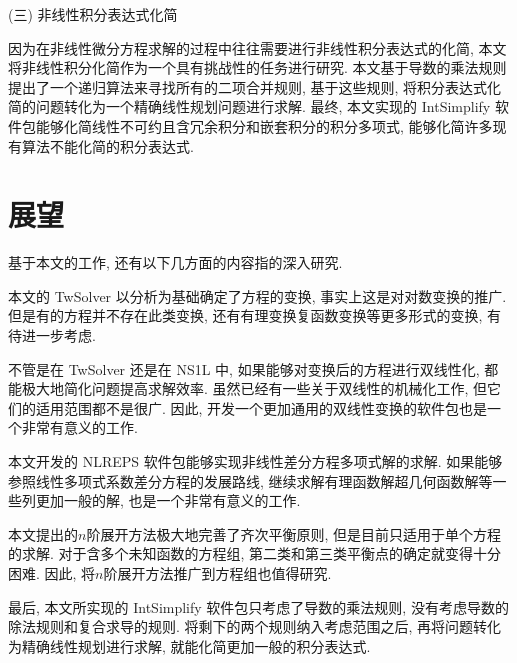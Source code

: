 (三) 非线性积分表达式化简

因为在非线性微分方程求解的过程中往往需要进行非线性积分表达式的化简, 本文将非线性积分化简作为一个具有挑战性的任务进行研究. 本文基于导数的乘法规则提出了一个递归算法来寻找所有的二项合并规则, 基于这些规则, 将积分表达式化简的问题转化为一个精确线性规划问题进行求解. 最终, 本文实现的 IntSimplify 软件包能够化简线性不可约且含冗余积分和嵌套积分的积分多项式, 能够化简许多现有算法不能化简的积分表达式.

\section{展望}
基于本文的工作, 还有以下几方面的内容指的深入研究.
\begin{compactenum}[(1)]
\item 本文的 TwSolver 以\Painleve{}分析为基础确定了方程的变换, 事实上这是对对数变换的推广. 但是有的方程并不存在此类变换, 还有有理变换\D 复函数变换等更多形式的变换, 有待进一步考虑.
\item 不管是在 TwSolver 还是在 NS1L 中, 如果能够对变换后的方程进行双线性化, 都能极大地简化问题\D 提高求解效率. 虽然已经有一些关于双线性的机械化工作, 但它们的适用范围都不是很广. 因此, 开发一个更加通用的双线性变换的软件包也是一个非常有意义的工作.
\item 本文开发的 NLREPS 软件包能够实现非线性差分方程多项式解的求解. 如果能够参照线性多项式系数差分方程的发展路线, 继续求解有理函数解\D 超几何函数解等一些列更加一般的解, 也是一个非常有意义的工作. 
\item 本文提出的$n$阶展开方法极大地完善了齐次平衡原则, 但是目前只适用于单个方程的求解. 对于含多个未知函数的方程组, 第二类和第三类平衡点的确定就变得十分困难. 因此, 将$n$阶展开方法推广到方程组也值得研究.
\item 最后, 本文所实现的 IntSimplify 软件包只考虑了导数的乘法规则, 没有考虑导数的除法规则和复合求导的规则. 将剩下的两个规则纳入考虑范围之后, 再将问题转化为精确线性规划进行求解, 就能化简更加一般的积分表达式. 
\end{compactenum}
